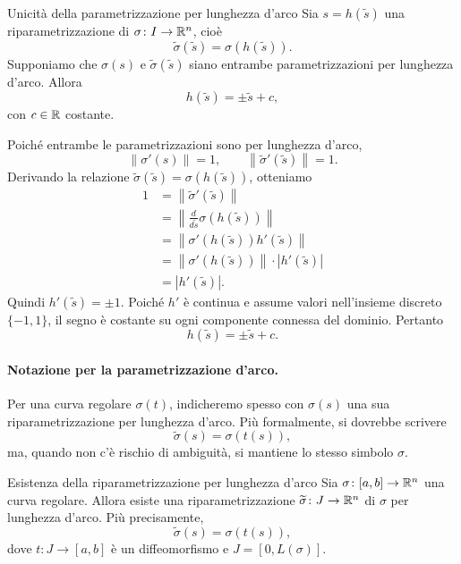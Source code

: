 \documentclass[a4paper]{article}
\begin{document}
\begin{snippetproposition}{Unicità della parametrizzazione per lunghezza d'arco}
Sia \(s=h(\widetilde{s})\) una riparametrizzazione di \(\sigma\colon I\to\mathbb{R}^n\), cioè
\[
    \widetilde{\sigma}(\widetilde{s})=\sigma(h(\widetilde{s})).
\]
Supponiamo che \(\sigma(s)\) e \(\widetilde{\sigma}(\widetilde{s})\) siano entrambe parametrizzazioni per lunghezza d'arco. Allora
\[
    h(\widetilde{s})=\pm\widetilde{s}+c,
\]
con \(c\in\mathbb{R}\) costante.
\end{snippetproposition}

\begin{snippetproof}{}
Poiché entrambe le parametrizzazioni sono per lunghezza d'arco,
\[
    \left\|\sigma'(s)\right\|=1,
    \qquad
    \left\|\widetilde{\sigma}'(\widetilde{s})\right\|=1.
\]
Derivando la relazione \(\widetilde{\sigma}(\widetilde{s})=\sigma(h(\widetilde{s}))\), otteniamo
\begin{align*}
    1
    &=\left\|\widetilde{\sigma}'(\widetilde{s})\right\|\\
    &=\left\|\frac{d}{d\widetilde{s}}\sigma(h(\widetilde{s}))\right\|\\
    &=\left\|\sigma'(h(\widetilde{s}))h'(\widetilde{s})\right\|\\
    &=\left\|\sigma'(h(\widetilde{s}))\right\|\cdot \left|h'(\widetilde{s})\right|\\
    &=\left|h'(\widetilde{s})\right|.
\end{align*}
Quindi \(h'(\widetilde{s})=\pm 1\). Poiché \(h'\) è continua e assume valori nell'insieme discreto \(\{-1,1\}\), il segno è costante su ogni componente connessa del dominio. Pertanto
\[
    h(\widetilde{s})=\pm\widetilde{s}+c.
\]
\end{snippetproof}

\paragraph{Notazione per la parametrizzazione d'arco.}
Per una curva regolare \(\sigma(t)\), indicheremo spesso con \(\sigma(s)\) una sua riparametrizzazione per lunghezza d'arco. Più formalmente, si dovrebbe scrivere
\[
    \widetilde{\sigma}(s)=\sigma(t(s)),
\]
ma, quando non c'è rischio di ambiguità, si mantiene lo stesso simbolo \(\sigma\).

\begin{snippettheorem}{Esistenza della riparametrizzazione per lunghezza d'arco}
Sia \(\sigma\colon [a,b]\to\mathbb{R}^n\) una curva regolare. Allora esiste una riparametrizzazione \(\widetilde{\sigma}\colon J\to\mathbb{R}^n\) di \(\sigma\) per lunghezza d'arco. Più precisamente,
\[
    \widetilde{\sigma}(s)=\sigma(t(s)),
\]
dove \(t\colon J\to [a,b]\) è un diffeomorfismo e \(J=[0,L(\sigma)]\).
\end{snippettheorem}
\end{document}

